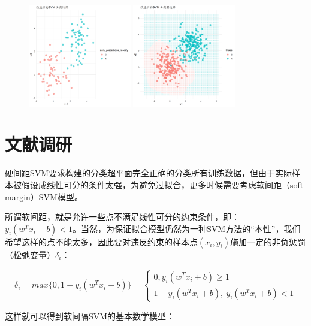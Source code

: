 \documentclass[12pt]{article}  %
\begin{document}
\begin{figure}[H]
	\centering
	\includegraphics[width=0.4\textwidth]{12.png}
	\includegraphics[width=0.4\textwidth]{13.png}
\end{figure}

\section{文献调研}	

硬间距SVM要求构建的分类超平面完全正确的分类所有训练数据，但由于实际样本被假设成线性可分的条件太强，为避免过拟合，更多时候需要考虑软间距（soft-margin）SVM模型。

所谓软间距，就是允许一些点不满足线性可分的约束条件，即：$y_i\left(w^Tx_i+b\right)<1$。当然，为保证拟合模型仍然为一种SVM方法的“本性”，我们希望这样的点不能太多，因此要对违反约束的样本点$(x_i, y_i)$施加一定的非负惩罚（松弛变量）$\delta_i$：

\begin{equation}
	\delta_i=max\{0, 1-y_i\left(w^Tx_i+b\right)\}=
	\begin{cases}
		0, y_i\left(w^Tx_i+b\right)\geq1\         \\                                           
		1-y_i\left(w^Tx_i+b\right),\ y_i\left(w^Tx_i+b\right)<1
	\end{cases}                               
\end{equation}

这样就可以得到软间隔SVM的基本数学模型：
\end{document}
